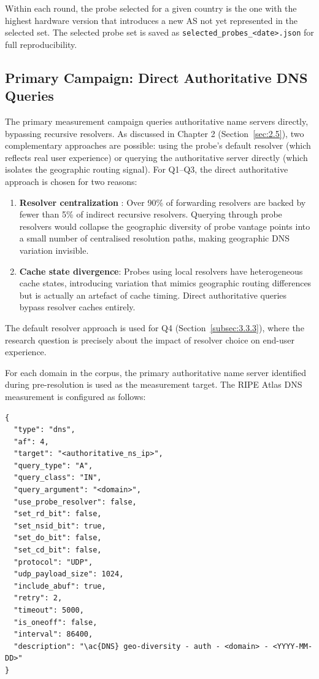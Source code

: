 Within each round, the probe selected for a given country is the one with the highest hardware version that introduces a new \ac{AS} not yet represented in the selected set. The selected probe set is saved as \texttt{selected\_probes\_<date>.json} for full reproducibility.

\subsection{Primary Campaign: Direct Authoritative DNS Queries}
\label{subsec:3.3.2}

The primary measurement campaign queries authoritative name servers directly, bypassing recursive resolvers. As discussed in Chapter 2 (Section~\ref{sec:2.5}), two complementary approaches are possible: using the probe's default resolver (which reflects real user experience) or querying the authoritative server directly (which isolates the geographic routing signal). For Q1--Q3, the direct authoritative approach is chosen for two reasons:

\begin{enumerate}
  \item \textbf{Resolver centralization} \cite{Xu2023}: Over 90\% of forwarding resolvers are backed by fewer than 5\% of indirect recursive resolvers. Querying through probe resolvers would collapse the geographic diversity of probe vantage points into a small number of centralised resolution paths, making geographic \ac{DNS} variation invisible.
  \item \textbf{Cache state divergence}: Probes using local resolvers have heterogeneous cache states, introducing variation that mimics geographic routing differences but is actually an artefact of cache timing. Direct authoritative queries bypass resolver caches entirely.
\end{enumerate}

The default resolver approach is used for Q4 (Section~\ref{subsec:3.3.3}), where the research question is precisely about the impact of resolver choice on end-user experience.

For each domain in the corpus, the primary authoritative name server identified during pre-resolution is used as the measurement target. The RIPE Atlas \ac{DNS} measurement is configured as follows:


\begin{lstlisting}[style=json]
{
  "type": "dns",
  "af": 4,
  "target": "<authoritative_ns_ip>",
  "query_type": "A",
  "query_class": "IN",
  "query_argument": "<domain>",
  "use_probe_resolver": false,
  "set_rd_bit": false,
  "set_nsid_bit": true,
  "set_do_bit": false,
  "set_cd_bit": false,
  "protocol": "UDP",
  "udp_payload_size": 1024,
  "include_abuf": true,
  "retry": 2,
  "timeout": 5000,
  "is_oneoff": false,
  "interval": 86400,
  "description": "\ac{DNS} geo-diversity - auth - <domain> - <YYYY-MM-DD>"
}

\end{lstlisting}

